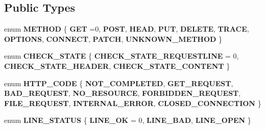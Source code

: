 \subsection*{Public Types}
\begin{DoxyCompactItemize}
\item 
\mbox{\label{classpink__http__machine_a64bc87fde84112f9e18a09c7d439aa2b}} 
enum {\bfseries M\+E\+T\+H\+OD} \{ \newline
{\bfseries G\+ET} =0, 
{\bfseries P\+O\+ST}, 
{\bfseries H\+E\+AD}, 
{\bfseries P\+UT}, 
\newline
{\bfseries D\+E\+L\+E\+TE}, 
{\bfseries T\+R\+A\+CE}, 
{\bfseries O\+P\+T\+I\+O\+NS}, 
{\bfseries C\+O\+N\+N\+E\+CT}, 
\newline
{\bfseries P\+A\+T\+CH}, 
{\bfseries U\+N\+K\+N\+O\+W\+N\+\_\+\+M\+E\+T\+H\+OD}
 \}
\item 
\mbox{\label{classpink__http__machine_aeb5dafe8258708065e5c09565dd37f9e}} 
enum {\bfseries C\+H\+E\+C\+K\+\_\+\+S\+T\+A\+TE} \{ {\bfseries C\+H\+E\+C\+K\+\_\+\+S\+T\+A\+T\+E\+\_\+\+R\+E\+Q\+U\+E\+S\+T\+L\+I\+NE} = 0, 
{\bfseries C\+H\+E\+C\+K\+\_\+\+S\+T\+A\+T\+E\+\_\+\+H\+E\+A\+D\+ER}, 
{\bfseries C\+H\+E\+C\+K\+\_\+\+S\+T\+A\+T\+E\+\_\+\+C\+O\+N\+T\+E\+NT}
 \}
\item 
\mbox{\label{classpink__http__machine_afb1e590cd61676c2f8859c4e01e5b150}} 
enum {\bfseries H\+T\+T\+P\+\_\+\+C\+O\+DE} \{ \newline
{\bfseries N\+O\+T\+\_\+\+C\+O\+M\+P\+L\+E\+T\+ED}, 
{\bfseries G\+E\+T\+\_\+\+R\+E\+Q\+U\+E\+ST}, 
{\bfseries B\+A\+D\+\_\+\+R\+E\+Q\+U\+E\+ST}, 
{\bfseries N\+O\+\_\+\+R\+E\+S\+O\+U\+R\+CE}, 
\newline
{\bfseries F\+O\+R\+B\+I\+D\+D\+E\+N\+\_\+\+R\+E\+Q\+U\+E\+ST}, 
{\bfseries F\+I\+L\+E\+\_\+\+R\+E\+Q\+U\+E\+ST}, 
{\bfseries I\+N\+T\+E\+R\+N\+A\+L\+\_\+\+E\+R\+R\+OR}, 
{\bfseries C\+L\+O\+S\+E\+D\+\_\+\+C\+O\+N\+N\+E\+C\+T\+I\+ON}
 \}
\item 
\mbox{\label{classpink__http__machine_ab93a9e606b05f96c1b4b0f7079d1e279}} 
enum {\bfseries L\+I\+N\+E\+\_\+\+S\+T\+A\+T\+US} \{ {\bfseries L\+I\+N\+E\+\_\+\+OK} = 0, 
{\bfseries L\+I\+N\+E\+\_\+\+B\+AD}, 
{\bfseries L\+I\+N\+E\+\_\+\+O\+P\+EN}
 \}
\end{DoxyCompactItemize}
